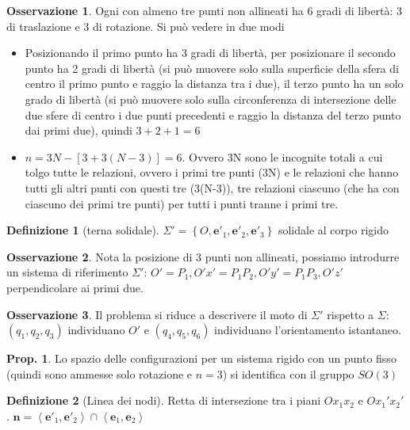 \documentclass[a4paper,10pt]{article}
\theoremstyle{definition}
\theoremstyle{indentdefinition}
\newtheorem{defn}{Definizione}[section]
\theoremstyle{indenttheorem}
\newtheorem{prop}{Prop.}
\theoremstyle{myremark}
\newtheorem*{rem*}{Osservazione}
\theoremstyle{indentgeneral}
\begin{document}
\begin{rem*}
Ogni  con almeno tre punti non allineati
ha 6 gradi di libertà: 3 di traslazione e 3 di rotazione. Si può vedere in due modi
\begin{itemize}
    \item Posizionando il primo punto ha 3 gradi di libertà, per posizionare il secondo punto ha 2 gradi di libertà (si può muovere solo sulla superficie della sfera di centro il primo punto e raggio la distanza tra i due), il terzo punto ha un solo grado di libertà (si può muovere solo sulla circonferenza di intersezione delle due sfere di centro i due punti precedenti e raggio la distanza del terzo punto dai primi due), quindi $3+2+1=6$
    \item $n=3N-[3+3(N-3)]=6$. Ovvero 3N sono le incognite totali a cui tolgo tutte le relazioni, ovvero i primi tre punti (3N) e le relazioni che hanno tutti gli altri punti con questi tre (3(N-3)), tre relazioni  ciascuno (che ha con ciascuno dei primi tre punti) per tutti i punti tranne i primi tre.
\end{itemize}
\end{rem*}
\begin{defn}[terna solidale]
\label{def:terna-solidale}$\Sigma'=\left\{ O,\boldsymbol{e}'_{1},\boldsymbol{e}'_{2},\boldsymbol{e}'_{3}\right\} $ solidale al corpo rigido
\end{defn}

\begin{rem*}
    Nota la posizione di 3 punti non allineati, possiamo introdurre un sistema di riferimento $\Sigma'$: $O'=P_1,O'x'= P_1P_2,O'y'= P_1P_3,O'z'$ perpendicolare ai primi due.
\end{rem*}
\begin{rem*}
    Il problema si  riduce a descrivere il moto di $\Sigma'$ rispetto a $\Sigma$: $(q_1,q_2,q_3)$ individuano $O'$ e  $(q_4,q_5,q_6)$ individuano  l'orientamento istantaneo.
\end{rem*}

\begin{prop}
    Lo spazio delle configurazioni per un sistema rigido con un punto fisso (quindi sono ammesse solo rotazione e $n=3$) si identifica con il gruppo $SO(3)$
\end{prop}

\begin{defn}[Linea dei nodi]
    Retta di intersezione tra i piani $Ox_1x_2$ e $Ox_1'x_2'$. $\boldsymbol{n}=\left\langle \boldsymbol{e}'_{1},\boldsymbol{e}'_{2}\right\rangle \cap\left\langle \boldsymbol{e}_{1},\boldsymbol{e}_{2}\right\rangle $
\end{defn}
\end{document}
